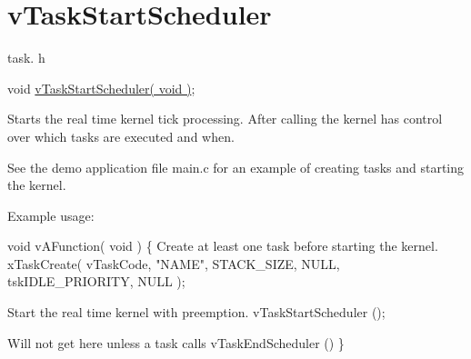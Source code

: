 \hypertarget{group__vTaskStartScheduler}{\section{v\-Task\-Start\-Scheduler}
\label{group__vTaskStartScheduler}
}
task. h 
\begin{DoxyPre}void \hyperlink{task_8h_aaf9dca1065c60abdeb309d56ab7293cb}{vTaskStartScheduler( void )};\end{DoxyPre}


Starts the real time kernel tick processing. After calling the kernel has control over which tasks are executed and when.

See the demo application file main.\-c for an example of creating tasks and starting the kernel.

Example usage\-: 
\begin{DoxyPre}
 void vAFunction( void )
 \{
Create at least one task before starting the kernel.
     xTaskCreate( vTaskCode, "NAME", STACK\_SIZE, NULL, tskIDLE\_PRIORITY, NULL );\end{DoxyPre}



\begin{DoxyPre}Start the real time kernel with preemption.
     vTaskStartScheduler ();\end{DoxyPre}



\begin{DoxyPre}Will not get here unless a task calls vTaskEndScheduler ()
 \}
   \end{DoxyPre}
 